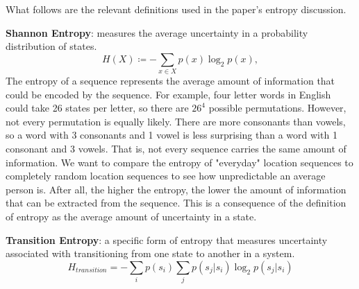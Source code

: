 \documentclass[11pt]{amsart}
\begin{document}

What follows are the relevant definitions used in the paper's entropy discussion.

\textbf{Shannon Entropy}: measures the average uncertainty in a probability distribution of states.
\begin{equation}
    \label{entropyeq}
    H( X ) ≔ - \sum_{x ∈ X}p( x )\log_2 p( x ),
\end{equation}
The entropy of a sequence represents the average amount of information that could be encoded by the sequence.
For example, four letter words in English could take 26 states per letter, so there are $26^4$ possible permutations.
However, not every permutation is equally likely.
There are more consonants than vowels, so a word with 3 consonants and 1 vowel is less surprising than a word with 1 consonant and 3 vowels.
That is, not every sequence carries the same amount of information.
We want to compare the entropy of "everyday" location sequences to completely random location sequences to see how unpredictable an average person is.
After all, the higher the entropy, the lower the amount of information that can be extracted from the sequence.
This is a consequence of the definition of entropy as the average amount of uncertainty in a state.

\textbf{Transition Entropy}: a specific form of entropy that measures uncertainty associated with transitioning from one state to another in a system.
\begin{equation}
    \label{transition_entropy}
    H_{transition} = -\sum_i p( s_i )\sum_j p( s_j|s_i )\log_2 p( s_j|s_i )
\end{equation}
\end{document}
